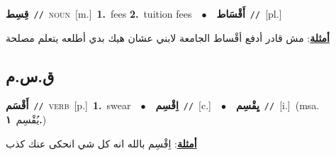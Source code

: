 \documentclass[10pt,a4paper,twoside]{article} %
\begin{document}
\begin{multicols}{2}
{\setlength\topsep{0pt}\textbf{\foreignlanguage{arabic}{قِسِط}}\ {\color{gray}\texttt{//}\color{black}}\ \textsc{noun}\ [m.]\ \textbf{1.}~fees  \textbf{2.}~tuition fees\ \ $\bullet$\ \ \setlength\topsep{0pt}\textbf{\foreignlanguage{arabic}{أَقْسَاط}}\ {\color{gray}\texttt{//}\color{black}}\ [pl.]\  \begin{flushright}\color{gray}\foreignlanguage{arabic}{\textbf{\underline{\foreignlanguage{arabic}{أمثلة}}}: مش قادر أدفع أقْساط الجامعة لابني عشان هيك بدي أطلعه يتعلم مصلحة}\end{flushright}\color{black}} \vspace{2mm}

\vspace{-3mm}
\subsection*{\color{blue}\foreignlanguage{arabic}{ق.س.م}\color{blue}{}} 

{\setlength\topsep{0pt}\textbf{\foreignlanguage{arabic}{أَقْسَم}}\ {\color{gray}\texttt{//}\color{black}}\ \textsc{verb}\ [p.]\ \textbf{1.}~swear\ \ $\bullet$\ \ \setlength\topsep{0pt}\textbf{\foreignlanguage{arabic}{اِقْسِم}}\ {\color{gray}\texttt{//}\color{black}}\ [c.]\ \ $\bullet$\ \ \setlength\topsep{0pt}\textbf{\foreignlanguage{arabic}{يِقْسِم}}\ {\color{gray}\texttt{//}\color{black}}\ [i.]\ \color{gray}(msa. \foreignlanguage{arabic}{يُقْسِم}~\foreignlanguage{arabic}{\textbf{١.}})\color{black}\  \begin{flushright}\color{gray}\foreignlanguage{arabic}{\textbf{\underline{\foreignlanguage{arabic}{أمثلة}}}: اِقْسِم بالله انه كل شي انحكى عنك كذب}\end{flushright}\color{black}} \vspace{2mm}


\end{multicols}
\end{document}
